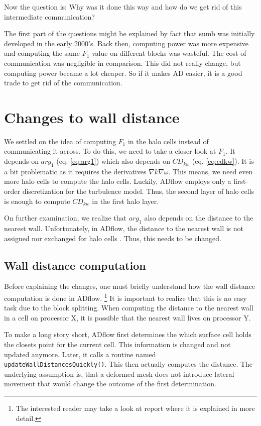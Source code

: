 Now the question is: Why was it done this way and how do we get rid of this
intermediate communication?

The first part of the questions might be explained by fact that sumb was
initially developed in the early 2000's. Back then, computing power was more
expensive and computing the same $F_1$ value on different blocks was
wasteful. The cost of communication was negligible in comparison. This did not
really change, but computing power became a lot cheaper. So if it makes AD
easier, it is a good trade to get rid of the communication.








\section{Changes to wall distance}
We settled on the idea of computing $F_1$ in the halo cells instead of
communicating it across. To do this, we need to take a closer look at $F_1$. It
depends on $arg_1$ (eq. \ref{eq:arg1}) which also depends on $CD_{kw}$ (eq.
\ref{eq:cdkw}). \noindent It is a bit problematic as it requires the
derivatives $\nabla k \nabla \omega$. This means, we need even more halo cells
to compute the halo cells. Luckily, ADflow employs only a first-order
discretization for the turbulence model. Thus, the second layer of halo cells
is enough to compute $CD_{kw}$ in the first halo layer.

On further examination, we realize that $arg_1$ also depends on the distance to
the nearest wall. Unfortunately, in ADflow, the distance to the nearest wall is
not assigned nor exchanged for halo cells . Thus, this needs to be changed.




\subsection{Wall distance computation}
Before explaining the changes, one must briefly understand how the wall
distance computation is done in ADflow. \footnote{The interested reader may
take a look at report \cite{vt1} where it is explained in more detail.} It is
important to realize that this is no easy task due to the block splitting. When
computing the distance to the nearest wall in a cell on processor X, it is
possible that the nearest wall lives on processor Y. 

To make a long story short, ADflow first determines the which surface cell
holds the closets point for the current cell. This information is changed and
not updated anymore. Later, it calls a routine named
\texttt{updateWallDistancesQuickly()}. This then actually computes the distance.
The underlying assumption is, that a deformed mesh does not introduce lateral
movement that would change the outcome of the first determination. 




